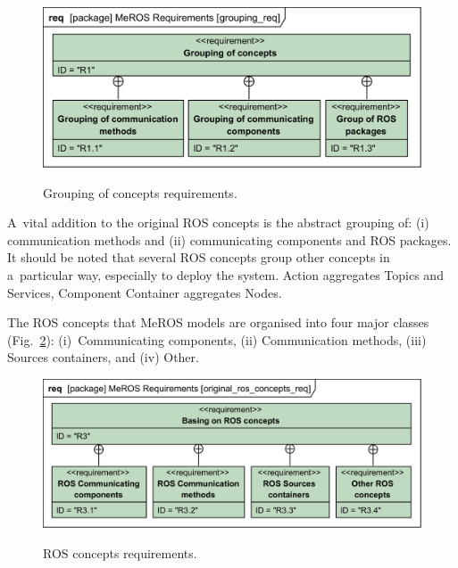 \documentclass[11pt,oneside,a4paper]{report}
\begin{document}
	\begin{figure}[H]
		\centering
		\begin{center}
			{\includegraphics[scale=1.0]{diagrams/grouping_req.png}}
		\end{center}
		\caption{Grouping of concepts requirements.} 
		\label{fig:grouping_req}
	\end{figure}
	
	A~vital addition to the original ROS concepts is the abstract grouping of:  (i) communication methods and (ii) communicating components and ROS packages.  It should be noted that several ROS concepts group other concepts in a~particular way, especially to deploy the system. Action aggregates Topics and Services, Component Container aggregates Nodes.

		
	The ROS concepts that MeROS models are organised into four major classes (Fig.~\ref{fig:ros_concepts_req}): (i)~Communicating components, (ii) Communication methods, (iii) Sources containers, and (iv) Other.
	

	\begin{figure}[H]
		\centering
		\begin{center}
			{\includegraphics[scale=1.0]{diagrams/original_ros_concepts_req.png}}
		\end{center}
		\caption{ROS concepts requirements.} 
		\label{fig:ros_concepts_req}
	\end{figure}

	\pagebreak
	
\end{document}
